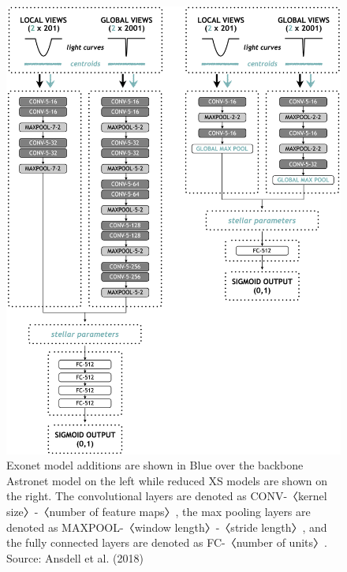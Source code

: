 \begin{figure}[h]
    \centering
    \includegraphics[scale=0.48]{Images/Ansdell.jpg}
    \caption{Exonet model additions are shown in Blue over the backbone Astronet model on the left while reduced XS models are shown on the right. The convolutional layers are denoted as CONV-〈kernel size〉-〈number of feature maps〉, the max pooling layers are denoted as MAXPOOL-〈window length〉-〈stride length〉, and the fully connected layers are denoted as FC-〈number of units〉. Source: Ansdell et al. (2018) \cite{exonet}}
    \label{fig:Ansdell}
\end{figure}